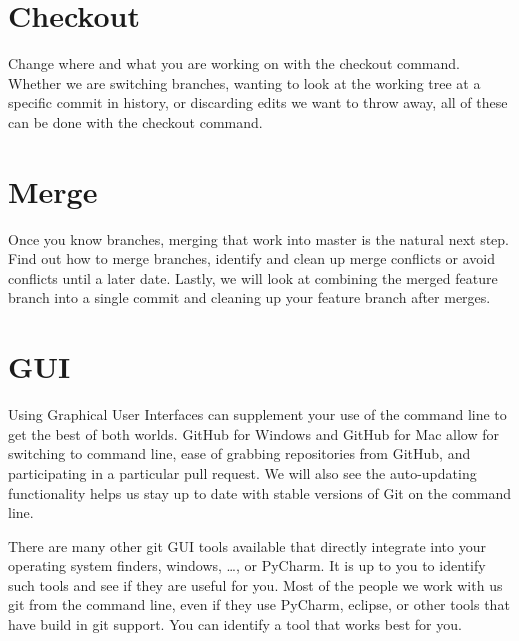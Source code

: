 
\section{Checkout}\label{checkout}

Change where and what you are working on with the checkout command.
Whether we are switching branches, wanting to look at the working tree at
a specific commit in history, or discarding edits we want to throw away,
all of these can be done with the checkout command.



\section{Merge}\label{merge}

Once you know branches, merging that work into master is the natural
next step. Find out how to merge branches, identify and clean up merge
conflicts or avoid conflicts until a later date. Lastly, we will look at
combining the merged feature branch into a single commit and cleaning up
your feature branch after merges.


\section{GUI}\label{gui}

Using Graphical User Interfaces can supplement your use of the command
line to get the best of both worlds. GitHub for Windows and GitHub for
Mac allow for switching to command line, ease of grabbing repositories
from GitHub, and participating in a particular pull request. We will also
see the auto-updating functionality helps us stay up to date with stable
versions of Git on the command line.


There are many other git GUI tools available that directly integrate into your
operating system finders, windows, \ldots{}, or PyCharm. It is up to you
to identify such tools and see if they are useful for you. Most of the
people we work with us git from the command line, even if they use
PyCharm, eclipse, or other tools that have build in git support. You can
identify a tool that works best for you.

